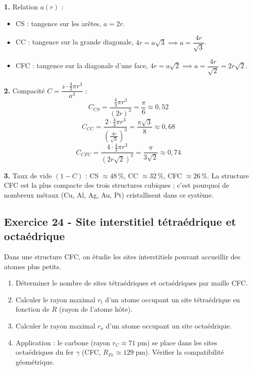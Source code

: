 \documentclass[12pt,a4paper]{article}
\begin{document}
\begin{boitecorrige}
\textbf{1.} Relation $a(r)$ :
\begin{itemize}[nosep]
  \item CS : tangence sur les arêtes, $a = 2r$.
  \item CC : tangence sur la grande diagonale, $4r = a\sqrt{3} \implies a = \dfrac{4r}{\sqrt{3}}$.
  \item CFC : tangence sur la diagonale d'une face, $4r = a\sqrt{2} \implies a = \dfrac{4r}{\sqrt{2}} = 2r\sqrt{2}$.
\end{itemize}

\textbf{2.} Compacité $C = \dfrac{z\cdot \frac{4}{3}\pi r^3}{a^3}$ :
\[
C_{CS} = \frac{\frac{4}{3}\pi r^3}{(2r)^3} = \frac{\pi}{6} \approx 0{,}52
\]
\[
C_{CC} = \frac{2\cdot \frac{4}{3}\pi r^3}{\left(\frac{4r}{\sqrt{3}}\right)^3} = \frac{\pi\sqrt{3}}{8} \approx 0{,}68
\]
\[
C_{CFC} = \frac{4\cdot \frac{4}{3}\pi r^3}{(2r\sqrt{2})^3} = \frac{\pi}{3\sqrt{2}} \approx 0{,}74
\]

\textbf{3.} Taux de vide $(1-C)$ : CS $\approx 48\,\%$, CC $\approx 32\,\%$, CFC $\approx 26\,\%$. La structure CFC est la plus compacte des trois structures cubiques ; c'est pourquoi de nombreux métaux (Cu, Al, Ag, Au, Pt) cristallisent dans ce système.
\end{boitecorrige}

\subsection*{Exercice 24 - Site interstitiel tétraédrique et octaédrique \niveau{\moyen}}

\begin{boiteexercice}
Dans une structure CFC, on étudie les sites interstitiels pouvant accueillir des atomes plus petits.
\begin{enumerate}
  \item Déterminer le nombre de sites tétraédriques et octaédriques par maille CFC.
  \item Calculer le rayon maximal $r_t$ d'un atome occupant un site tétraédrique en fonction de $R$ (rayon de l'atome hôte).
  \item Calculer le rayon maximal $r_o$ d'un atome occupant un site octaédrique.
  \item Application : le carbone (rayon $r_C \approx 71\;\text{pm}$) se place dans les sites octaédriques du fer $\gamma$ (CFC, $R_{Fe} \approx 129\;\text{pm}$). Vérifier la compatibilité géométrique.
\end{enumerate}
\end{boiteexercice}
\end{document}
